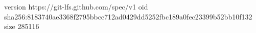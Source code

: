 version https://git-lfs.github.com/spec/v1
oid sha256:8183740ae3368f2795bbcc712ad0429dd5252fbc189a0fec23399b52bb10f132
size 285116
